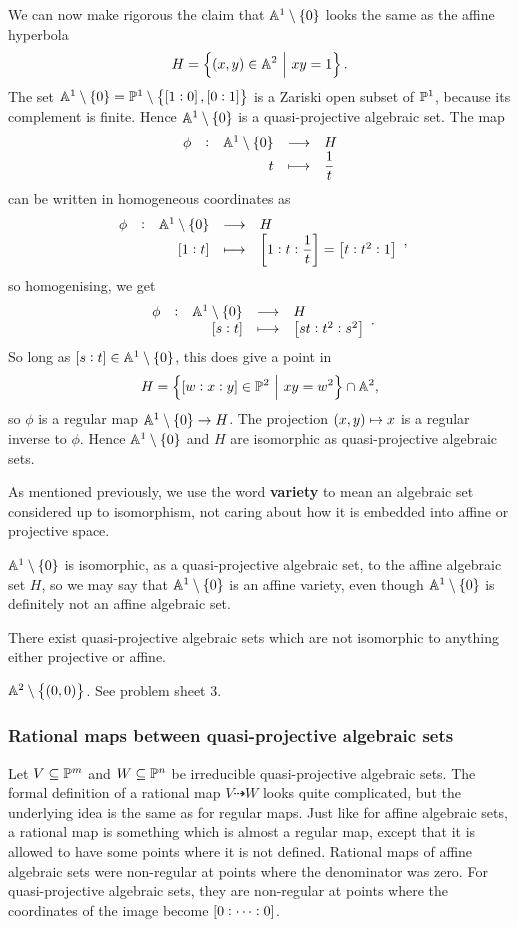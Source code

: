 \begin{example*}
We can now make rigorous the claim that $ \AA^1 \setminus \cbr{0} $ looks the same as the affine hyperbola
$$ H = \cbr{\br{x, y} \in \AA^2 \st xy = 1}. $$
The set $ \AA^1 \setminus \cbr{0} = \PP^1 \setminus \cbr{\sbr{1 : 0}, \sbr{0 : 1}} $ is a Zariski open subset of $ \mathbb{P}^1 $, because its complement is finite. Hence $ \AA^1 \setminus \cbr{0} $ is a quasi-projective algebraic set. The map
$$ \function[\phi]{\AA^1 \setminus \cbr{0}}{H}{t}{\dfrac{1}{t}} $$
can be written in homogeneous coordinates as
$$ \function[\phi]{\AA^1 \setminus \cbr{0}}{H}{\sbr{1 : t}}{\sbr{1 : t : \dfrac{1}{t}} = \sbr{t : t^2 : 1}}, $$
so homogenising, we get
$$ \function[\phi]{\AA^1 \setminus \cbr{0}}{H}{\sbr{s : t}}{\sbr{st : t^2 : s^2}}. $$
So long as $ \sbr{s : t} \in \AA^1 \setminus \cbr{0} $, this does give a point in
$$ H = \cbr{\sbr{w : x : y} \in \PP^2 \st xy = w^2} \cap \AA^2, $$
so $ \phi $ is a regular map $ \AA^1 \setminus \cbr{0} \to H $. The projection $ \br{x, y} \mapsto x $ is a regular inverse to $ \phi $. Hence $ \AA^1 \setminus \cbr{0} $ and $ H $ are isomorphic as quasi-projective algebraic sets.
\end{example*}

As mentioned previously, we use the word \textbf{variety} to mean an algebraic set considered up to isomorphism, not caring about how it is embedded into affine or projective space.

\begin{example*}
$ \AA^1 \setminus \cbr{0} $ is isomorphic, as a quasi-projective algebraic set, to the affine algebraic set $ H $, so we may say that $ \AA^1 \setminus \cbr{0} $ is an affine variety, even though $ \AA^1 \setminus \cbr{0} $ is definitely not an affine algebraic set.
\end{example*}

There exist quasi-projective algebraic sets which are not isomorphic to anything either projective or affine.

\begin{example*}
$ \AA^2 \setminus \cbr{\br{0, 0}} $. See problem sheet $ 3 $.
\end{example*}

\subsubsection{Rational maps between quasi-projective algebraic sets}

Let $ V \subseteq \mathbb{P}^m $ and $ W \subseteq \mathbb{P}^n $ be irreducible quasi-projective algebraic sets. The formal definition of a rational map $ V \dashrightarrow W $ looks quite complicated, but the underlying idea is the same as for regular maps. Just like for affine algebraic sets, a rational map is something which is almost a regular map, except that it is allowed to have some points where it is not defined. Rational maps of affine algebraic sets were non-regular at points where the denominator was zero. For quasi-projective algebraic sets, they are non-regular at points where the coordinates of the image become $ \sbr{0 : \dots : 0} $.

